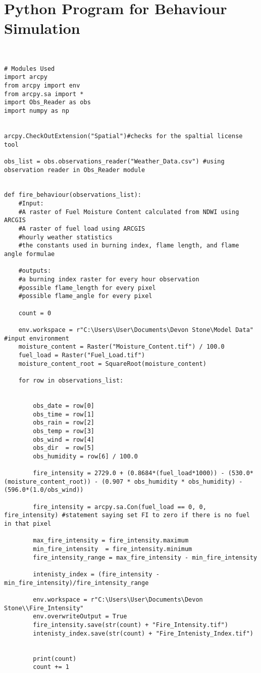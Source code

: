 
\chapter{Python Program for Behaviour Simulation} %

\label{AppendixB} %

\begin{lstlisting}


# Modules Used
import arcpy
from arcpy import env
from arcpy.sa import *
import Obs_Reader as obs
import numpy as np


arcpy.CheckOutExtension("Spatial")#checks for the spaltial license tool

obs_list = obs.observations_reader("Weather_Data.csv") #using observation reader in Obs_Reader module


def fire_behaviour(observations_list):
    #Input: 
    #A raster of Fuel Moisture Content calculated from NDWI using ARCGIS
    #A raster of fuel load using ARCGIS
    #hourly weather statistics
    #the constants used in burning index, flame length, and flame angle formulae

    #outputs:
    #a burning index raster for every hour observation
    #possible flame_length for every pixel
    #possible flame_angle for every pixel

    count = 0

    env.workspace = r"C:\Users\User\Documents\Devon Stone\Model Data" #input environment
    moisture_content = Raster("Moisture_Content.tif") / 100.0
    fuel_load = Raster("Fuel_Load.tif")
    moisture_content_root = SquareRoot(moisture_content)

    for row in observations_list:


        obs_date = row[0]
        obs_time = row[1]
        obs_rain = row[2]
        obs_temp = row[3]
        obs_wind = row[4]
        obs_dir  = row[5]
        obs_humidity = row[6] / 100.0

        fire_intensity = 2729.0 + (0.8684*(fuel_load*1000)) - (530.0*(moisture_content_root)) - (0.907 * obs_humidity * obs_humidity) - (596.0*(1.0/obs_wind))

        fire_intensity = arcpy.sa.Con(fuel_load == 0, 0, fire_intensity) #statement saying set FI to zero if there is no fuel in that pixel

        max_fire_intensity = fire_intensity.maximum
        min_fire_intensity  = fire_intensity.minimum
        fire_intensity_range = max_fire_intensity - min_fire_intensity

        intenisty_index = (fire_intensity - min_fire_intensity)/fire_intensity_range
     
        env.workspace = r"C:\Users\User\Documents\Devon Stone\\Fire_Intensity"
        env.overwriteOutput = True
        fire_intensity.save(str(count) + "Fire_Intensity.tif")
        intenisty_index.save(str(count) + "Fire_Intenisty_Index.tif")


        print(count)
        count += 1
        

\end{lstlisting}